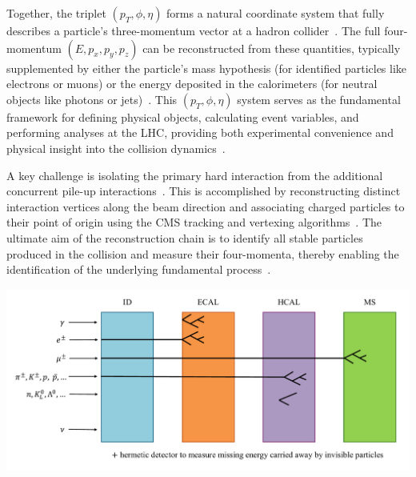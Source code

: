 Together, the triplet $(p_T, \phi, \eta)$ forms a natural coordinate system that fully describes a particle's three-momentum vector at a hadron collider~\cite{CMS:PF2017,1674-1137-40-10-100001}. The full four-momentum $(E, p_x, p_y, p_z)$ can be reconstructed from these quantities, typically supplemented by either the particle's mass hypothesis (for identified particles like electrons or muons) or the energy deposited in the calorimeters (for neutral objects like photons or jets)~\cite{CMS_EGM_17001,CMS_MUON_17001,Cacciari:2011ma}. This $(p_T, \phi, \eta)$ system serves as the fundamental framework for defining physical objects, calculating event variables, and performing analyses at the LHC, providing both experimental convenience and physical insight into the collision dynamics~\cite{CMS:PF2017,Cacciari:2011ma}.

A key challenge is isolating the primary hard interaction from the additional concurrent pile-up interactions~\cite{Apollinari2017_HLLHC,Bertolini:2014}. This is accomplished by reconstructing distinct interaction vertices along the beam direction and associating charged particles to their point of origin using the CMS tracking and vertexing algorithms~\cite{CMS:TRK2014,CMS:PF2017}. The ultimate aim of the reconstruction chain is to identify all stable particles produced in the collision and measure their four-momenta, thereby enabling the identification of the underlying fundamental process~\cite{CMS:PF2017}.

\begin{center}
    \includegraphics[width=\textwidth]{Images/Layers.pdf}
    \label{fig_layers}
\end{center}


